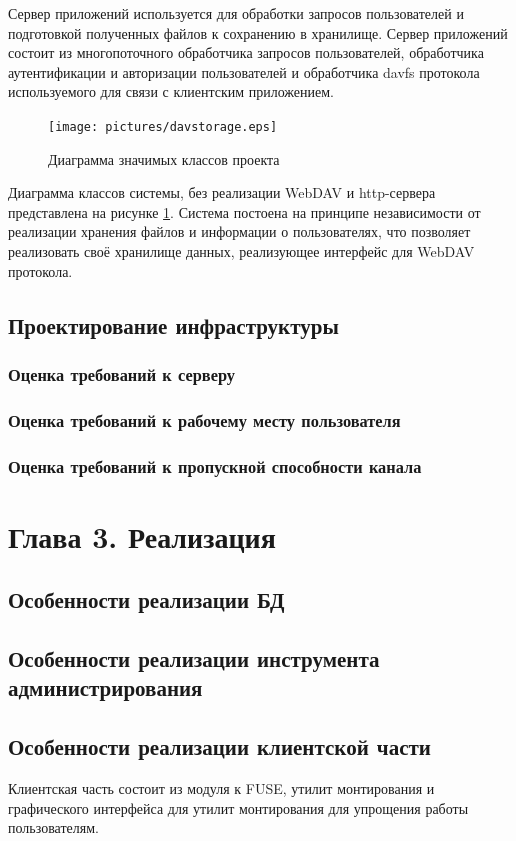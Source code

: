 \documentclass[utf8,usehyperref,12pt]{G7-32}
\begin{document}
Сервер приложений используется для обработки запросов пользователей и подготовкой полученных файлов к сохранению в хранилище. Сервер приложений состоит из многопоточного обработчика запросов пользователей, обработчика аутентификации и авторизации пользователей и обработчика davfs протокола используемого для связи с клиентским приложением.

\begin{figure}[ht]
   \centering%
   \texttt{[image: pictures/davstorage.eps]}
   \caption{Диаграмма значимых классов проекта}\label{fig:davstorage}
 \end{figure}
 
 Диаграмма классов системы, без реализации WebDAV и http-сервера представлена на рисунке \ref{fig:davstorage}. Система постоена на принципе независимости от реализации хранения файлов и информации о пользователях, что позволяет реализовать своё хранилище данных, реализующее интерфейс для WebDAV протокола.

\section{Проектирование инфраструктуры}
\subsection{Оценка требований к серверу}
\subsection{Оценка требований к рабочему месту пользователя}
\subsection{Оценка требований к пропускной способности канала}

\chapter{Глава 3. Реализация}
\section{Особенности реализации БД}
\section{Особенности реализации инструмента администрирования}
\section{Особенности реализации клиентской части}
Клиентская часть состоит из модуля к FUSE, утилит монтирования и графического интерфейса для утилит монтирования для упрощения работы пользователям. 
\end{document}
